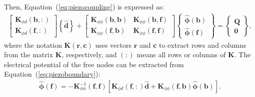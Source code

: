 \documentclass[sensors,article,accept,moreauthors,pdftex]{Definitions/mdpi}
\begin{document}
\begin{paracol}{2}
Then, Equation~(\ref{eq:piezocoupling}) is expressed as:
\begin{eqnarray}
\left [\begin{array}{c}
\textbf{K}_{\phi d}(\textbf{b},:) \\
\textbf{K}_{\phi d}(\textbf{f},:)
\end{array}\right]
\left \{\widehat{\textbf{d}}\right\} +
\left [\begin{array}{cc}
\textbf{K}_{\phi \phi}(\textbf{b},\textbf{b}) & \textbf{K}_{\phi \phi}(\textbf{b},\textbf{f})\\
\textbf{K}_{\phi \phi}(\textbf{f},\textbf{b}) & \textbf{K}_{\phi \phi}(\textbf{f},\textbf{f})
\end{array}\right]
\left \{\begin{array}{c}
\widehat{\boldsymbol{\phi}}(\textbf{b}) \\
\widehat{\boldsymbol{\phi}}(\textbf{f})
\end{array}\right \} = 
\left \{\begin{array}{c}
\textbf{Q} \\
\textbf{0}
\end{array}\right \},
\label{eq:piezoboundary}
\end{eqnarray} 
where the notation \(\textbf{K}(\textbf{r},\textbf{c})\) uses vectors \(\textbf{r}\) and \(\textbf{c}\) to extract rows and columns from the matrix \(\textbf{K}\), respectively, and \((:)\) means all rows or columns of \(\textbf{K}\).
The electrical potential of the free nodes can be extracted from Equation~(\ref{eq:piezoboundary}):
\begin{eqnarray}
\widehat{\boldsymbol{\phi}}(\textbf{f}) = -\textbf{K}_{\phi\phi}^{-1}(\textbf{f},\textbf{f})\left[\textbf{K}_{\phi d}(\textbf{f},:) \widehat{\textbf{d}} + \textbf{K}_{\phi\phi}(\textbf{f},\textbf{b})\widehat{\boldsymbol{\phi}}(\textbf{b}) \right].
\label{eq:freePotetial}
\end{eqnarray}


\end{paracol}
\end{document}
